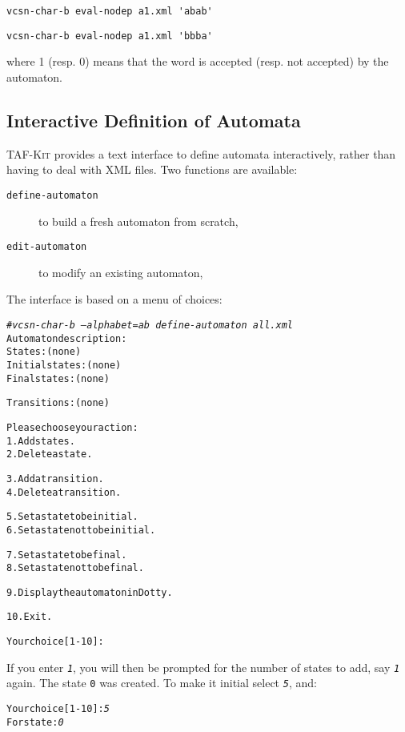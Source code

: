 \documentclass[a4paper]{report}
\newenvironment{shell}
{\begin{alltt}}
{\end{alltt}}
\newcommand\kbd[1]{\textsl{\texttt{#1}}}
\newcommand\code[1]{\texttt{#1}}
\newcommand{\taffn}[1]{\code{#1}}
\newcommand{\tafkit}{\textsc{TAF-Kit}\xspace}
\begin{document}
\begin{verbatim}
vcsn-char-b eval-nodep a1.xml 'abab'
\end{verbatim}
\begin{verbatim}
vcsn-char-b eval-nodep a1.xml 'bbba'
\end{verbatim}

\noindent
where 1 (resp. 0) means that the word is accepted (resp. not accepted)
by the automaton.

\subsection{Interactive Definition of Automata}

\tafkit provides a text interface to define automata interactively,
rather than having to deal with XML files.  Two functions are
available:
\begin{description}
\item[\taffn{define-automaton}] to build a fresh automaton from scratch,
\item[\taffn{edit-automaton}] to modify an existing automaton,
\end{description}

The interface is based on a menu of choices:
\begin{shell}
# \kbd{vcsn-char-b --alphabet=ab define-automaton all.xml}
Automaton description:
  States: (none)
  Initial states: (none)
  Final states: (none)

  Transitions: (none)

Please choose your action:
  1. Add states.
  2. Delete a state.

  3. Add a transition.
  4. Delete a transition.

  5. Set a state to be initial.
  6. Set a state not to be initial.

  7. Set a state to be final.
  8. Set a state not to be final.

  9. Display the automaton in Dotty.

  10. Exit.

Your choice [1-10]:
\end{shell}

\noindent
If you enter \kbd{1}, you will then be prompted for the number of
states to add, say \kbd{1} again.  The state \code{0} was created.  To
make it initial select \kbd{5}, and:

\begin{shell}
Your choice [1-10]: \kbd{5}
  For state: \kbd{0}
\end{shell}
\end{document}
